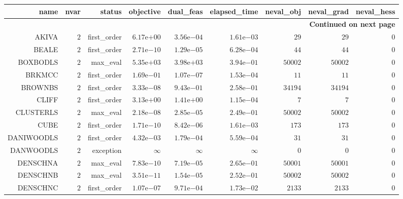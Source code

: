 \begin{longtable}{rrrrrrrrr}
\hline
name & nvar & status & objective & dual\_feas & elapsed\_time & neval\_obj & neval\_grad & neval\_hess \\\hline
\endhead
\hline
\multicolumn{9}{r}{{\bfseries Continued on next page}}\\
\hline
\endfoot
\endlastfoot
AKIVA & \(     2\) & first\_order & \( 6.17\)e\(+00\) & \( 3.56\)e\(-04\) & \( 1.61\)e\(-03\) & \(    29\) & \(    29\) & \(     0\) \\
BEALE & \(     2\) & first\_order & \( 2.71\)e\(-10\) & \( 1.29\)e\(-05\) & \( 6.28\)e\(-04\) & \(    44\) & \(    44\) & \(     0\) \\
BOXBODLS & \(     2\) & max\_eval & \( 5.35\)e\(+03\) & \( 3.98\)e\(+03\) & \( 3.94\)e\(-01\) & \( 50002\) & \( 50002\) & \(     0\) \\
BRKMCC & \(     2\) & first\_order & \( 1.69\)e\(-01\) & \( 1.07\)e\(-07\) & \( 1.53\)e\(-04\) & \(    11\) & \(    11\) & \(     0\) \\
BROWNBS & \(     2\) & first\_order & \( 3.33\)e\(-08\) & \( 9.43\)e\(-01\) & \( 2.58\)e\(-01\) & \( 34194\) & \( 34194\) & \(     0\) \\
CLIFF & \(     2\) & first\_order & \( 3.13\)e\(+00\) & \( 1.41\)e\(+00\) & \( 1.15\)e\(-04\) & \(     7\) & \(     7\) & \(     0\) \\
CLUSTERLS & \(     2\) & max\_eval & \( 2.18\)e\(-08\) & \( 2.85\)e\(-05\) & \( 2.49\)e\(-01\) & \( 50002\) & \( 50002\) & \(     0\) \\
CUBE & \(     2\) & first\_order & \( 1.71\)e\(-10\) & \( 8.42\)e\(-06\) & \( 1.61\)e\(-03\) & \(   173\) & \(   173\) & \(     0\) \\
DANIWOODLS & \(     2\) & first\_order & \( 4.32\)e\(-03\) & \( 1.79\)e\(-04\) & \( 5.59\)e\(-04\) & \(    31\) & \(    31\) & \(     0\) \\
DANWOODLS & \(     2\) & exception & \(\infty\) & \(\infty\) & \(\infty\) & \(     0\) & \(     0\) & \(     0\) \\
DENSCHNA & \(     2\) & max\_eval & \( 7.83\)e\(-10\) & \( 7.19\)e\(-05\) & \( 2.65\)e\(-01\) & \( 50001\) & \( 50001\) & \(     0\) \\
DENSCHNB & \(     2\) & max\_eval & \( 3.51\)e\(-11\) & \( 1.54\)e\(-05\) & \( 2.52\)e\(-01\) & \( 50002\) & \( 50002\) & \(     0\) \\
DENSCHNC & \(     2\) & first\_order & \( 1.07\)e\(-07\) & \( 9.71\)e\(-04\) & \( 1.73\)e\(-02\) & \(  2133\) & \(  2133\) & \(     0\) \\

\end{longtable}
